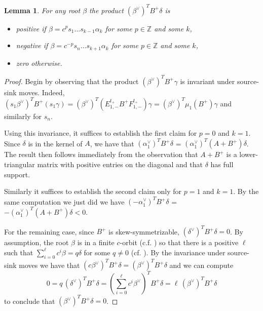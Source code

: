 \documentclass{amsart}
\newtheorem{lemma}[theorem]{Lemma}
\numberwithin{theorem}{section}
\newcommand{\ZZ}{\mathbb{Z}}
\begin{document}
  \begin{lemma}
    \label{le:euler pairing}
    For any root $\beta$ the product $(\beta^\vee)^T B^+ \delta$ is
    \begin{itemize}
      \item positive if $\beta = c^p s_1\dots s_{k-1}\alpha_k$ for some $p\in\ZZ$ and some $k$,
      \item negative if $\beta = c^{-p} s_n\dots s_{k+1}\alpha_k$ for some $p\in\ZZ$ and some $k$,
      \item zero otherwise.
    \end{itemize}
  \end{lemma}

  \begin{proof}
    Begin by observing that the product $(\beta^\vee)^T B^+ \gamma$ is invariant under source-sink moves.
    Indeed, $(s_1\beta^\vee)^T B^+ (s_1\gamma) = (\beta^\vee)^T (E^{t_+}_{1,-} B^+ F^{t_+}_{1,-}) \gamma = (\beta^\vee)^T \mu_1(B^+) \gamma$ and similarly for $s_n$.

    Using this invariance, it suffices to establish the first claim for $p=0$ and $k=1$.
    Since $\delta$ is in the kernel of $A$, we have that $(\alpha_1^\vee)^T B^+ \delta$ = $(\alpha_1^\vee)^T (A+B^+) \delta$.
    The result then follows immediately from the observation that $A + B^+$ is a lower-triangular matrix with positive entries on the diagonal and that $\delta$ has full support.

    Similarly it suffices to establish the second claim only for $p=1$ and $k=1$.
    By the same computation we just did we have $(-\alpha_1^\vee)^T B^+ \delta$ = $-(\alpha_1^\vee)^T (A+B^+) \delta <0$.

    For the remaining case, since $B^+$ is skew-symmetrizable, $(\delta^\vee)^T B^+ \delta = 0$.
    By assumption, the root $\beta$ is in a finite $c$-orbit (c.f. \cite[Proposition 1.9 and Section 1, final Remark]{Dlab-Ringel}) so that there is a positive $\ell$ such that $\sum_{i=0}^\ell c^i \beta = q \delta$ for some $q\neq 0$ (cf. \cite{afforb}).
    By the invariance under source-sink moves we have that $(c\beta^\vee)^T B^+ \delta = (\beta^\vee)^T B^+ \delta$ and we can compute
    \[
      0 = q\, (\delta^\vee)^T B^+ \delta = \left(\sum_{i=0}^\ell c^i \beta^\vee\right)^T B^+ \delta = \ell\, (\beta^\vee)^T B^+ \delta
    \]
  to conclude that $(\beta^\vee)^T B^+ \delta = 0$.
  \end{proof}
\end{document}
